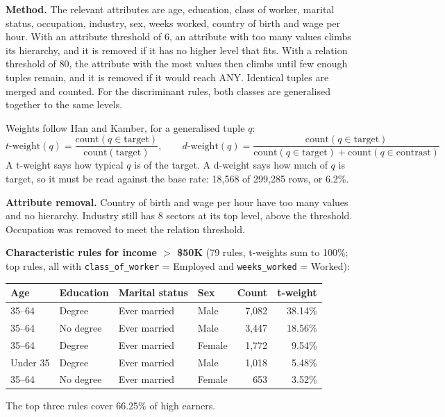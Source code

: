 \documentclass[10pt]{article}
\begin{document}
\textbf{Method.} The relevant attributes are age, education, class of worker, marital status, occupation, industry, sex, weeks worked, country of birth and wage per hour. With an attribute threshold of 6, an attribute with too many values climbs its hierarchy, and it is removed if it has no higher level that fits. With a relation threshold of 80, the attribute with the most values then climbs until few enough tuples remain, and it is removed if it would reach ANY. Identical tuples are merged and counted. For the discriminant rules, both classes are generalised together to the same levels.

Weights follow Han and Kamber, for a generalised tuple $q$:
\[ t\text{-weight}(q) = \frac{\text{count}(q \in \text{target})}{\text{count}(\text{target})}, \qquad
d\text{-weight}(q) = \frac{\text{count}(q \in \text{target})}{\text{count}(q \in \text{target}) + \text{count}(q \in \text{contrast})} \]
A t-weight says how typical $q$ is of the target. A d-weight says how much of $q$ is target, so it must be read against the base rate: 18,568 of 299,285 rows, or 6.2\%.

\textbf{Attribute removal.} Country of birth and wage per hour have too many values and no hierarchy. Industry still has 8 sectors at its top level, above the threshold. Occupation was removed to meet the relation threshold.

\textbf{Characteristic rules for income $>$ \$50K} (79 rules, t-weights sum to 100\%; top rules, all with \texttt{class\_of\_worker} = Employed and \texttt{weeks\_worked} = Worked):
\begin{center}\small
\begin{tabular}{llllrr}
\toprule
Age & Education & Marital status & Sex & Count & t-weight \\
\midrule
35--64 & Degree & Ever married & Male & 7,082 & 38.14\% \\
35--64 & No degree & Ever married & Male & 3,447 & 18.56\% \\
35--64 & Degree & Ever married & Female & 1,772 & 9.54\% \\
Under 35 & Degree & Ever married & Male & 1,018 & 5.48\% \\
35--64 & No degree & Ever married & Female & 653 & 3.52\% \\
\bottomrule
\end{tabular}
\end{center}
The top three rules cover 66.25\% of high earners.
\end{document}
